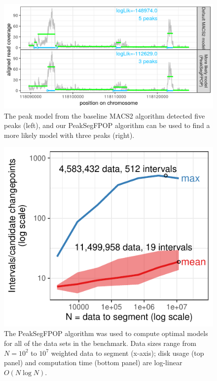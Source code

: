 \documentclass[article]{jss}
\begin{document}
\begin{figure}[t!]
\centering
\includegraphics{jss-figure-more-likely-models-three-peaks}
\caption{\label{fig:three-peaks} The peak model from the baseline
  MACS2 algorithm detected five peaks (left), and our PeakSegFPOP
  algorithm can be used to find a more likely model with three peaks
  (right).}
\end{figure}
 
\begin{figure}[t!]
\centering
\includegraphics{jss-figure-target-intervals-models}
\caption{\label{fig:target-intervals-models} The PeakSegFPOP algorithm
  was used to compute optimal models for all of the data sets in the
  benchmark. Data sizes range from $N=10^2$ to $10^7$ weighted data to
  segment (x-axis); disk usage (top panel) and computation time
  (bottom panel) are log-linear $O(N \log N)$.}
\end{figure}
 
\end{document}
